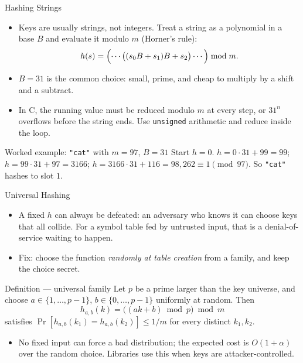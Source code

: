 \documentclass[aspectratio=169]{beamer}
\begin{document}
\begin{frame}{Hashing Strings}
  \begin{itemize}
    \item Keys are usually strings, not integers. Treat a string as a
      polynomial in a base $B$ and evaluate it modulo $m$ (Horner's rule):
      \[
        h(s) = \Bigl(\cdots\bigl((s_0 B + s_1)B + s_2\bigr)\cdots\Bigr)
        \bmod m.
      \]
    \item $B = 31$ is the common choice: small, prime, and cheap to multiply
      by a shift and a subtract.
    \item In C, the running value must be reduced modulo $m$ at every step,
      or $31^{n}$ overflows before the string ends. Use \texttt{unsigned}
      arithmetic and reduce inside the loop.
  \end{itemize}
  \begin{exampleblock}{Worked example: \texttt{"cat"} with $m=97$, $B=31$}
    Start $h=0$. $h = 0\cdot31 + 99 = 99$;
    $h = 99\cdot31 + 97 = 3166$;
    $h = 3166\cdot31 + 116 = 98{,}262 \equiv 1 \pmod{97}$.
    So \texttt{"cat"} hashes to slot $1$.
  \end{exampleblock}
\end{frame}

\begin{frame}{Universal Hashing}
  \begin{itemize}
    \item A fixed $h$ can always be defeated: an adversary who knows it can
      choose keys that all collide. For a symbol table fed by untrusted input,
      that is a denial-of-service waiting to happen.
    \item Fix: choose the function \emph{randomly at table creation} from a
      family, and keep the choice secret.
  \end{itemize}
  \begin{block}{Definition --- universal family}
    Let $p$ be a prime larger than the key universe, and choose
    $a \in \{1,\dots,p-1\}$, $b \in \{0,\dots,p-1\}$ uniformly at random.
    Then
    \[
      h_{a,b}(k) = \bigl((ak+b) \bmod p\bigr) \bmod m
    \]
    satisfies $\Pr[h_{a,b}(k_1)=h_{a,b}(k_2)] \le 1/m$ for every distinct
    $k_1,k_2$.
  \end{block}
  \begin{itemize}
    \item No fixed input can force a bad distribution; the expected cost is
      $O(1+\alpha)$ over the random choice. Libraries use this when keys are
      attacker-controlled.
  \end{itemize}
\end{frame}
\end{document}
